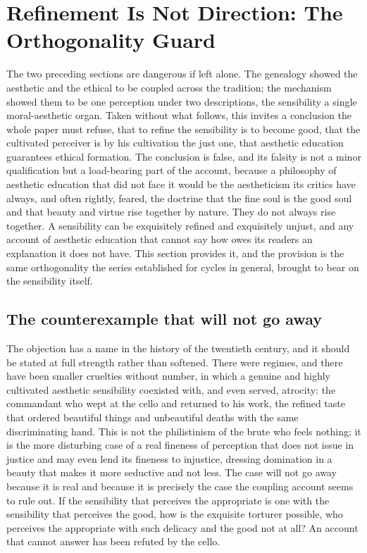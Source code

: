 \section{Refinement Is Not Direction: The Orthogonality Guard}
\label{p22:sec:orthogonality}

\noindent
The two preceding sections are dangerous if left alone. The genealogy showed the aesthetic and the ethical to be coupled across the tradition; the mechanism showed them to be one perception under two descriptions, the sensibility a single moral-aesthetic organ. Taken without what follows, this invites a conclusion the whole paper must refuse, that to refine the sensibility is to become good, that the cultivated perceiver is by his cultivation the just one, that aesthetic education guarantees ethical formation. The conclusion is false, and its falsity is not a minor qualification but a load-bearing part of the account, because a philosophy of aesthetic education that did not face it would be the aestheticism its critics have always, and often rightly, feared, the doctrine that the fine soul is the good soul and that beauty and virtue rise together by nature. They do not always rise together. A sensibility can be exquisitely refined and exquisitely unjust, and any account of aesthetic education that cannot say how owes its readers an explanation it does not have. This section provides it, and the provision is the same orthogonality the series established for cycles in general, brought to bear on the sensibility itself.

\subsection{The counterexample that will not go away}
\label{p22:sub:orth-counterexample}

The objection has a name in the history of the twentieth century, and it should be stated at full strength rather than softened. There were regimes, and there have been smaller cruelties without number, in which a genuine and highly cultivated aesthetic sensibility coexisted with, and even served, atrocity: the commandant who wept at the cello and returned to his work, the refined taste that ordered beautiful things and unbeautiful deaths with the same discriminating hand. This is not the philistinism of the brute who feels nothing; it is the more disturbing case of a real fineness of perception that does not issue in justice and may even lend its fineness to injustice, dressing domination in a beauty that makes it more seductive and not less. The case will not go away because it is real and because it is precisely the case the coupling account seems to rule out. If the sensibility that perceives the appropriate is one with the sensibility that perceives the good, how is the exquisite torturer possible, who perceives the appropriate with such delicacy and the good not at all? An account that cannot answer has been refuted by the cello.

